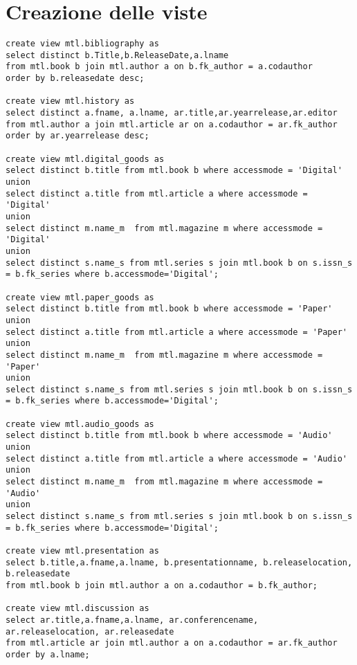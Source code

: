 \section{Creazione delle viste}
\begin{lstlisting}
create view mtl.bibliography as
select distinct b.Title,b.ReleaseDate,a.lname
from mtl.book b join mtl.author a on b.fk_author = a.codauthor
order by b.releasedate desc;

create view mtl.history as
select distinct a.fname, a.lname, ar.title,ar.yearrelease,ar.editor
from mtl.author a join mtl.article ar on a.codauthor = ar.fk_author
order by ar.yearrelease desc;

create view mtl.digital_goods as
select distinct b.title from mtl.book b where accessmode = 'Digital'
union
select distinct a.title from mtl.article a where accessmode = 'Digital'
union
select distinct m.name_m  from mtl.magazine m where accessmode = 'Digital'
union
select distinct s.name_s from mtl.series s join mtl.book b on s.issn_s = b.fk_series where b.accessmode='Digital';

create view mtl.paper_goods as
select distinct b.title from mtl.book b where accessmode = 'Paper'
union
select distinct a.title from mtl.article a where accessmode = 'Paper'
union
select distinct m.name_m  from mtl.magazine m where accessmode = 'Paper'
union
select distinct s.name_s from mtl.series s join mtl.book b on s.issn_s = b.fk_series where b.accessmode='Digital';

create view mtl.audio_goods as
select distinct b.title from mtl.book b where accessmode = 'Audio'
union
select distinct a.title from mtl.article a where accessmode = 'Audio'
union
select distinct m.name_m  from mtl.magazine m where accessmode = 'Audio'
union
select distinct s.name_s from mtl.series s join mtl.book b on s.issn_s = b.fk_series where b.accessmode='Digital';

create view mtl.presentation as
select b.title,a.fname,a.lname, b.presentationname, b.releaselocation, b.releasedate
from mtl.book b join mtl.author a on a.codauthor = b.fk_author;

create view mtl.discussion as
select ar.title,a.fname,a.lname, ar.conferencename, ar.releaselocation, ar.releasedate
from mtl.article ar join mtl.author a on a.codauthor = ar.fk_author
order by a.lname;
\end{lstlisting}

